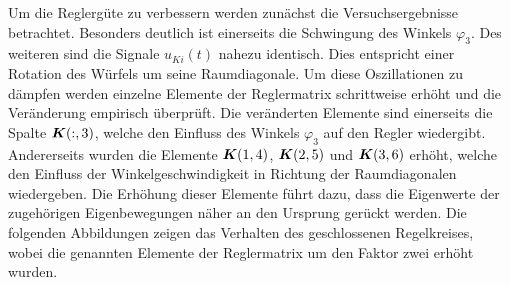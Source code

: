 Um die Reglergüte zu verbessern werden zunächst die Versuchsergebnisse betrachtet. Besonders deutlich ist einerseits die Schwingung des Winkels $\varphi_3$. Des weiteren sind die Signale $u_{Ki}(t)$ nahezu identisch. Dies entspricht einer Rotation des Würfels um seine Raumdiagonale. Um diese Oszillationen zu dämpfen werden einzelne Elemente der Reglermatrix schrittweise erhöht und die Veränderung empirisch überprüft. Die veränderten Elemente sind einerseits die Spalte $\boldsymbol{K}(:,3)$, welche den Einfluss des Winkels $\varphi_3$ auf den Regler wiedergibt. Andererseits wurden die Elemente $\boldsymbol{K}(1,4)$, $\boldsymbol{K}(2,5)$ und $\boldsymbol{K}(3,6)$ erhöht, welche den Einfluss der Winkelgeschwindigkeit in Richtung der Raumdiagonalen wiedergeben. Die Erhöhung dieser Elemente führt dazu, dass die Eigenwerte der zugehörigen Eigenbewegungen näher an den Ursprung gerückt werden. Die folgenden Abbildungen zeigen das Verhalten des geschlossenen Regelkreises, wobei die genannten Elemente der Reglermatrix um den Faktor zwei erhöht wurden.

